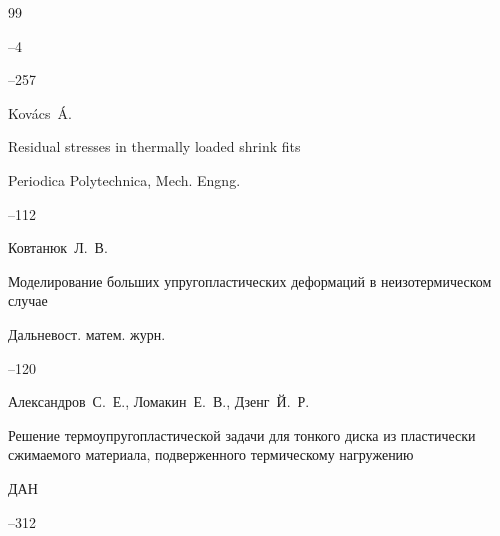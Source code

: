 \begin{thebibliography}{99}

--4

--257









\by Kov\'acs~\'A.

\paper Residual stresses in thermally loaded shrink fits


\jour Periodica Polytechnica, Mech. Engng.



--112




\by Ковтанюк~Л.~В.

\paper Моделирование больших упругопластических деформаций в неизотермическом случае

\jour Дальневост. матем. журн.




--120





\by Александров~С.~Е., Ломакин~Е.~В., Дзенг~Й.~Р.

\paper Решение термоупругопластической задачи для тонкого диска из пластически сжимаемого материала, подверженного термическому нагружению

\jour ДАН




--312







\end{thebibliography}
